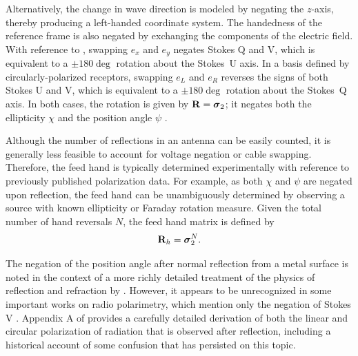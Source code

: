 Alternatively, the change in wave direction is modeled by negating the $z$-axis, thereby producing a left-handed coordinate system.
%
The handedness of the reference frame is also negated by exchanging the components of the electric field.
%
With reference to ,
%
swapping $e_x$ and $e_y$ negates Stokes Q and V,
%
which is equivalent to a $\pm 180\deg$ rotation about the Stokes~U axis.
%
In a basis defined by circularly-polarized receptors, 
swapping $e_L$ and $e_R$
reverses the signs of both Stokes U and V,
%
which is equivalent to a $\pm 180\deg$ rotation about the Stokes~Q axis.
%
In both cases, the rotation is given by ${\bf R}=\mbox{\boldmath $\sigma$}_{2}$; it negates both the ellipticity 
$\chi$  and the position angle $\psi$ .

%
Although the number of reflections in an antenna can be easily counted, it is generally less feasible to account for voltage negation or cable swapping.
%
Therefore, the feed hand is typically determined experimentally with reference to previously published polarization data.
%
For example, as both $\chi$ and $\psi$ are negated upon reflection, the feed hand can be unambiguously determined by observing a source with known ellipticity or Faraday rotation measure.
%
Given the total number of hand reversals $N$, the feed hand matrix is
defined by 
%
\begin{equation}
{\bf R}_h = \mbox{\boldmath $\sigma$}_{2}^N.
\end{equation}

The negation of the position angle
after normal reflection 
from a metal surface 
is noted in the context of a more richly detailed treatment of the physics of reflection and refraction by \citet{bw80}.
%
However, it appears to be unrecognized in some important works on radio polarimetry, which mention only the negation of Stokes V \cite[e.g.,][]{hbs96,rh21}.
%
%
Appendix A of \cite{cla10} provides a carefully detailed derivation of
both the linear and circular polarization of radiation that is observed after reflection,
including a historical account of some confusion that has persisted on this topic.
%

%
%
%
%
%
%


